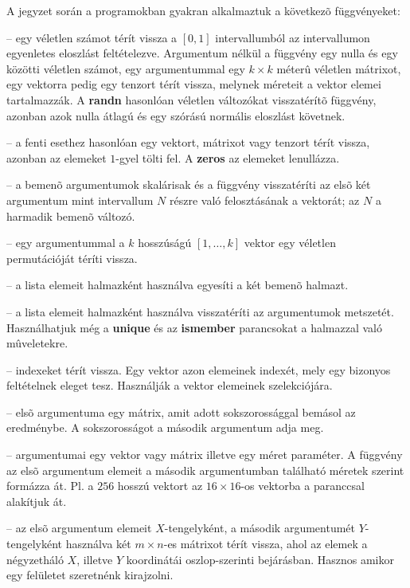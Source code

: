 A jegyzet során a programokban gyakran alkalmaztuk a következõ függvényeket:
{ \renewcommand{\baselinestretch}{0.98}\normalsize
\begin{description}
    \setlength{\itemsep}{0.04mm}
    \item[rand] -- egy véletlen számot térít vissza a $[0,1]$ intervallumból az intervallumon egyenletes eloszlást feltételezve. Argumentum nélkül a függvény egy nulla és egy közötti véletlen számot, egy argumentummal egy $k\times k$ méterû véletlen mátrixot, egy vektorra pedig egy tenzort térít vissza, melynek méreteit a vektor elemei tartalmazzák. A {\bf randn} hasonlóan véletlen változókat visszatérítõ függvény, azonban azok nulla átlagú és egy szórású normális eloszlást követnek.
    \item[ones] -- a fenti esethez hasonlóan egy vektort, mátrixot vagy tenzort térít vissza, azonban az elemeket $1$-gyel tölti fel. A {\bf zeros} az elemeket lenullázza.
    \item[linspace] -- a bemenõ argumentumok skalárisak és a függvény visszatéríti az elsõ két argumentum mint intervallum $N$ részre való felosztásának a vektorát; az $N$ a harmadik bemenõ változó.
    \item[randperm] -- egy argumentummal a $k$ hosszúságú $[1,\ldots,k]$ vektor egy véletlen permutációját téríti vissza.
    \item[union] -- a lista elemeit halmazként használva egyesíti a két bemenõ halmazt.
    \item[setdiff] -- a lista elemeit halmazként használva visszatéríti az argumentumok metszetét. Használhatjuk még a {\bf unique} és az {\bf ismember} parancsokat a halmazzal való mûveletekre.
    \item[find] -- indexeket térít vissza. Egy vektor azon elemeinek indexét, mely egy bizonyos feltételnek eleget tesz. Használják a vektor elemeinek szelekciójára.
    \item[repmat] -- elsõ argumentuma egy mátrix, amit adott sokszorossággal bemásol az eredménybe. A sokszorosságot a második argumentum adja meg.
    \item[reshape] -- argumentumai egy vektor vagy mátrix illetve egy méret paraméter. A függvény az elsõ argumentum elemeit a második argumentumban található méretek szerint formázza át. Pl. a  $256$ hosszú vektort az  $16\times 16$-os vektorba a  paranccsal alakítjuk át.
    \item[meshgrid] -- az elsõ argumentum elemeit $X$-tengelyként, a második argumentumét $Y$-tengelyként használva két $m\times n$-es mátrixot térít vissza, ahol az elemek a négyzetháló $X$, illetve $Y$ koordinátái oszlop-szerinti bejárásban. Hasznos amikor egy felületet szeretnénk kirajzolni.

\end{description}}
